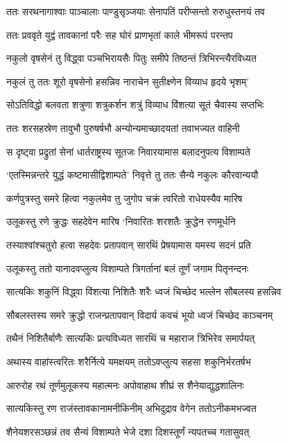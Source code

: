 \twolineshloka
{ततः सरथनागाश्वाः पाञ्चालाः पाण्डुसृञ्जयाः}
{सेनापतिं परीप्सन्तो रुरुधुस्तनयं तव}


\twolineshloka
{ततः प्रववृते युद्वं तावकानां परैः सह}
{घोरं प्राणभृतां काले भीमरूपं परन्तप}


\twolineshloka
{नकुलो वृषसेनं तु विद्ध्वा पञ्चभिरायसैः}
{पितुः समीपे तिष्ठन्तं त्रिभिरन्त्यैरविध्यत}


\twolineshloka
{नकुलं तु ततः शूरो वृषसेनो हसन्निव}
{नाराचेन सुतीक्ष्णेन विव्याध हृदये भृशम्'}


\twolineshloka
{सोऽतिविद्धो बलवता शत्रुणा शत्रुकर्शन}
{शत्रुं विव्याध विंशत्या सूतं चैवास्य सप्तभिः}


\twolineshloka
{ततः शरसहस्रेण तावुभौ पुरुषर्षभौ}
{अन्योन्यमाच्छादयतां तवाभज्यत वाहिनी}


\twolineshloka
{स दृष्ट्वा प्रद्रुतां सेनां धार्तराष्ट्रस्य सूतजः}
{निवारयामास बलादनुपत्य विशाम्पते}


\twolineshloka
{`एतस्मिन्नन्तरे युद्धं कष्टमासीद्विशाम्पते'}
{निवृत्ते तु ततः सैन्ये नकुलः कौरवान्ययौ}


\twolineshloka
{कर्णपुत्रस्तु समरे हित्वा नकुलमेव तु}
{जुगोप चक्रं त्वरितो राधेयस्यैव मारिष}


\twolineshloka
{उलूकस्तु रणे क्रुद्धः सहदेवेन मारिष}
{`निवारितः शरशतैः क्रुद्धेन रणमूर्धनि}


\twolineshloka
{तस्याश्वांश्चतुरो हत्वा सहदेवः प्रतापवान्}
{सारथिं प्रेषयामास यमस्य सदनं प्रति}


\twolineshloka
{उलूकस्तु ततो यानादवप्लुत्य विशाम्पते}
{त्रिगर्तानां बलं तूर्णं जगाम पितृनन्दनः}


\twolineshloka
{सात्यकिः शकुनिं विद्ध्वा विंशत्या निशितैः शरैः}
{ध्वजं चिच्छेद भल्लेन सौबलस्य हसन्निव}


\twolineshloka
{सौबलस्तस्य समरे क्रुद्धो राजन्प्रतापवान्}
{विदार्य कवचं भूयो ध्वजं चिच्छेद काञ्चनम्}


\twolineshloka
{तथैनं निशितैर्बाणैः सात्यकिः प्रत्यविध्यत}
{सारथिं च महाराज त्रिभिरेव समार्पयत्}


\twolineshloka
{अथास्य वाहांस्त्वरितः शरैर्नित्ये यमक्षयम्}
{ततोऽवप्लुत्य सहसा शकुनिर्भरतर्षभ}


\twolineshloka
{आरुरोह रथं तूर्णमुलूकस्य महात्मनः}
{अपोवाहाथ शीघ्रं स शैनेयाद्युद्धशालिनः}


\twolineshloka
{सात्यकिस्तु रण राजंस्तावकानामनीकिनीम्}
{अभिदुद्राव वेगेन ततोऽनीकमभज्वत}


\twolineshloka
{शैनेयशरसञ्छन्नं तव सैन्यं विशाम्पते}
{भेजे दशा दिशस्तूर्णं न्यपतच्च गतासुवत्}


